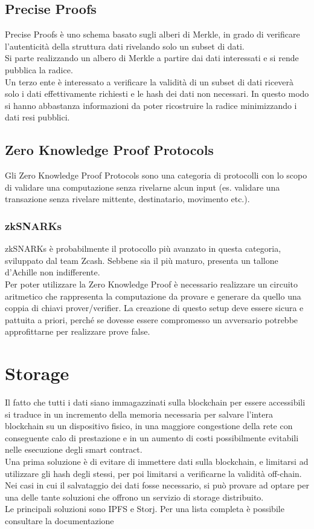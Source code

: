 \subsection{Precise Proofs}
Precise Proofs è uno schema basato sugli alberi di Merkle, in grado di verificare l'autenticità della struttura dati rivelando solo un subset di dati. \\
Si parte realizzando un albero di Merkle a partire dai dati interessati e si rende pubblica la radice. \\
Un terzo ente è interessato a verificare la validità di un subset di dati riceverà solo i dati effettivamente richiesti e le hash dei dati non necessari.
In questo modo si hanno abbastanza informazioni da poter ricostruire la radice minimizzando i dati resi pubblici.

\subsection{Zero Knowledge Proof Protocols}
Gli Zero Knowledge Proof Protocols sono una categoria di protocolli con lo scopo di validare una computazione senza rivelarne alcun input (es. validare una transazione senza rivelare mittente, destinatario, movimento etc.). \\

\subsubsection{zkSNARKs}
zkSNARKs è probabilmente il protocollo più avanzato in questa categoria, sviluppato dal team Zcash. Sebbene sia il più maturo, presenta un tallone d'Achille non indifferente. \\
Per poter utilizzare la Zero Knowledge Proof è necessario realizzare un circuito aritmetico che rappresenta la computazione da provare e generare da quello una coppia di chiavi prover/verifier.
La creazione di questo setup deve essere sicura e pattuita a priori, perché se dovesse essere compromesso un avversario potrebbe approfittarne per realizzare prove false.


\section{Storage}
Il fatto che tutti i dati siano immagazzinati sulla blockchain per essere accessibili si traduce in un incremento della memoria necessaria per salvare l'intera blockchain su un dispositivo fisico, 
in una maggiore congestione della rete con conseguente calo di prestazione e in un aumento di costi possibilmente evitabili nelle esecuzione degli smart contract. \\
Una prima soluzione è di evitare di immettere dati sulla blockchain, e limitarsi ad utilizzare gli hash degli stessi, per poi limitarsi a verificarne la validità off-chain. \\
Nei casi in cui il salvataggio dei dati fosse necessario, si può provare ad optare per una delle tante soluzioni che offrono un servizio di storage distribuito. \\
Le principali soluzioni sono IPFS e Storj.
Per una lista completa è possibile consultare la documentazione \cite{wiki:ew-storage}

